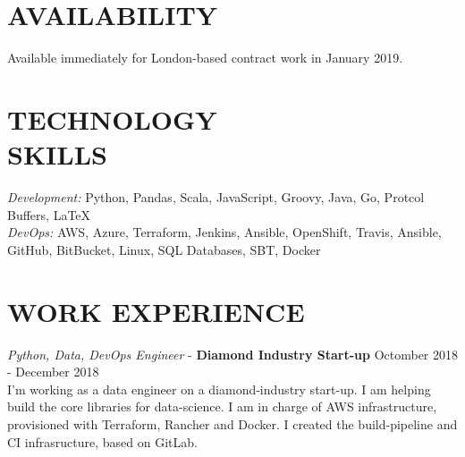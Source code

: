 \documentclass[margin, 10pt]{res} %
\begin{document}
    \begin{resume}


        \section{AVAILABILITY}

        Available immediately for London-based contract work in January 2019.


        \section{TECHNOLOGY \\ SKILLS}

        {\sl Development:} Python, Pandas, Scala, JavaScript, Groovy, Java, Go, Protcol Buffers, \LaTeX \\
        {\sl DevOps:} AWS, Azure, Terraform, Jenkins, Ansible, OpenShift, Travis, Ansible, GitHub, BitBucket, Linux, SQL Databases, SBT, Docker\\


        \section{WORK EXPERIENCE}

        {\sl Python, Data, DevOps Engineer} - \textbf{Diamond Industry Start-up} \hfill Octomber 2018 - December 2018 \\

         I'm working as a data engineer on a diamond-industry start-up. I am helping build the core libraries for
         data-science. I am in charge of AWS infrastructure, provisioned with Terraform, Rancher and Docker. I created the
         build-pipeline and CI infrasructure, based on GitLab.


\end{resume}
\end{document}
